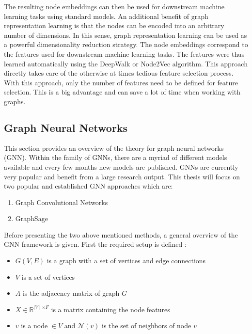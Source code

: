	\noindent The resulting node embeddings can then be used for downstream
	machine learning tasks using standard models. An additional benefit of 
	graph representation learning is that the nodes can be encoded into an 
	arbitrary number of dimensions. In this sense, graph representation 
	learning can be used as a powerful dimensionality reduction strategy. 
	The node embeddings correspond to the features used for downstream 
	machine learning tasks. The features were thus learned automatically using 
	the DeepWalk or Node2Vec algorithm. This approach directly takes care of the 
	otherwise at times tedious feature selection process. With this approach, 
	only the number of features need to be defined for feature selection. This 
	is a big advantage and can save a lot of time when working with graphs. 

	\subsection{Graph Neural Networks}
	\label{section:GNN_theory}

	This section provides an overview of the theory for graph neural networks
	(GNN). Within the family of GNNs, there are a myriad of different models 
	available and every few months new models are published. GNNs are currently 
	very popular and benefit from a large research output. This thesis will 
	focus on two popular and established GNN approaches which are:

	\begin{enumerate}
		\item Graph Convolutional Networks
		\item GraphSage
	\end{enumerate}
	
	\noindent Before presenting the two above mentioned methods, a general
	overview of the GNN framework is given. First the required setup is
	defined \citep{leskovec2021lecture}:

	\begin{itemize}
		\setlength\itemsep{0.2em}
		\item $G(V,E)$ is a graph with a set of vertices and edge connections
		\item $V$ is a set of vertices
		\item $A$ is the adjacency matrix of graph $G$
		\item $X \in \mathbb{R}^{\mid V\mid \times F}$ is a matrix containing
			the node features
		\item $v$ is a node $\in V$ and $\mathcal{N}(v)$ is the set of 
			neighbors of node $v$
	\end{itemize}


